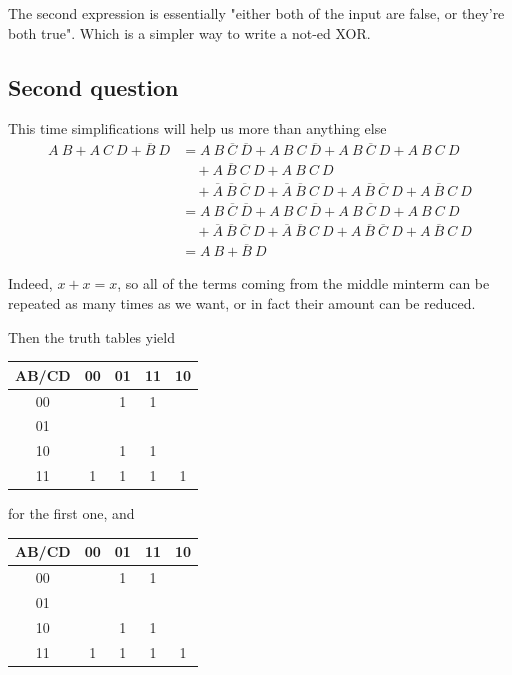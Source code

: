 \documentclass[a4paper,10pt]{article}
\begin{document}
The second expression is essentially "either both of the input are false, or they're both true". Which is a simpler way to write a not-ed XOR.

\subsection{Second question}

This time simplifications will help us more than anything else
\begin{align*}
	A~B+A~C~D+\overline{B}~D&=A~B~\overline{C}~\overline{D}+A~B~C~\overline{D}+A~B~\overline{C}~D+A~B~C~D\\
		&\quad+A~\overline{B}~C~D+A~B~C~D\\
		&\quad+\overline{A}~\overline{B}~\overline{C}~D+\overline{A}~\overline{B}~C~D+A~\overline{B}~\overline{C}~D+A~\overline{B}~C~D\\
		&=A~B~\overline{C}~\overline{D}+A~B~C~\overline{D}+A~B~\overline{C}~D+A~B~C~D\\
		&\quad+\overline{A}~\overline{B}~\overline{C}~D+\overline{A}~\overline{B}~C~D+A~\overline{B}~\overline{C}~D+A~\overline{B}~C~D\\
		&=A~B+\overline{B}~D
\end{align*}

Indeed, $x+x=x$, so all of the terms coming from the middle minterm can be repeated as many times as we want, or in fact their amount can be reduced.

Then the truth tables yield
\begin{center}
	\begin{tabular}{|c|c|c|c|c|}
		AB/CD&00&01&11&10\\\hline
		00&&1&1&\\\hline
		01&&&&\\\hline
		10&&1&1&\\\hline
		11&1&1&1&1\\\hline
	\end{tabular}
\end{center}

for the first one, and
\begin{center}
	\begin{tabular}{|c|c|c|c|c|}
		AB/CD&00&01&11&10\\\hline
		00&&1&1&\\\hline
		01&&&&\\\hline
		10&&1&1&\\\hline
		11&1&1&1&1\\\hline
	\end{tabular}
\end{center}
\end{document}

